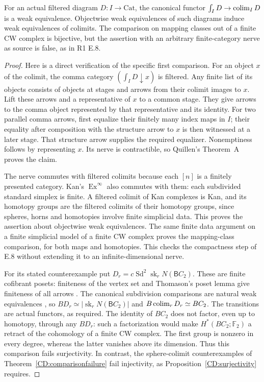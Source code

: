 \begin{proposition}
\label{CD:E8}
For an actual filtered diagram $D:I\to\mathrm{Cat}$, the canonical
functor $\int_I D\to\operatorname{colim}_I D$ is a weak equivalence.
Objectwise weak equivalences of such diagrams induce weak
equivalences of colimits.  The comparison on mapping classes out
of a finite CW complex is bijective, but the assertion with an
arbitrary finite-category nerve as source is false, as in R1 E.8.
\end{proposition}
\begin{proof}
Here is a direct verification of the specific first comparison.
For an object $x$ of the colimit, the comma category
$(\int_I D\downarrow x)$ is filtered.  Any finite list of its
objects consists of objects at stages and arrows from their colimit
images to $x$.  Lift these arrows and a representative of $x$ to a
common stage.  They give arrows to the comma object represented by
that representative and its identity.  For two parallel comma
arrows, first equalize their finitely many index maps in $I$;
their equality after composition with the structure arrow to $x$
is then witnessed at a later stage.  That structure arrow supplies
the required equalizer.  Nonemptiness follows by representing $x$.
Its nerve is contractible, so Quillen's Theorem~A proves the claim.

The nerve commutes with filtered colimits because each $[n]$ is a
finitely presented category.  Kan's $\operatorname{Ex}^{\infty}$
also commutes with them: each subdivided standard simplex is finite.
A filtered colimit of Kan complexes is Kan, and its homotopy groups
are the filtered colimits of their homotopy groups, since spheres,
horns and homotopies involve finite simplicial data.  This proves
the assertion about objectwise weak equivalences.  The same finite
data argument on a finite simplicial model of a finite CW complex
proves the mapping-class comparison, for both maps and homotopies.
This checks the compactness step of E.8 without extending it to an
infinite-dimensional nerve.

For its stated counterexample put
$D_r=c\operatorname{Sd}^2\operatorname{sk}_rN(\mathsf BC_2)$.
These are finite cofibrant posets: finiteness of the vertex set and
Thomason's poset lemma give finiteness of all arrows
\cite[Proposition 4.6 and Lemma 5.6]{CDThomason1980}.
The canonical subdivision comparisons are natural weak equivalences
\cite[Theorem 4.11 and Example 4.12(iv)--(v)]{CDFritschLatch1981},
so $BD_r\simeq|\operatorname{sk}_rN(\mathsf BC_2)|$ and
$B\operatorname{colim}_rD_r\simeq BC_2$.  The transitions are actual functors,
as required.  The identity of $BC_2$ does not factor, even up to
homotopy, through any $BD_r$: such a factorization would make
$H^*(BC_2;\mathbb F_2)$ a retract of the cohomology of a finite
CW complex.  The first group is nonzero in every degree, whereas
the latter vanishes above its dimension.  Thus this comparison
fails surjectivity.  In contrast, the sphere-colimit counterexamples
of Theorem~\ref{CD:comparisonfailure} fail injectivity, as
Proposition~\ref{CD:surjectivity} requires.
\end{proof}

